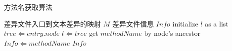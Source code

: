 \renewcommand{\thealgorithm}{1}
    \begin{algorithm}
        \caption{方法名获取算法}
        \begin{algorithmic}[1]
            \Require 差异文件入口到文本差异的映射 $M$
            \Ensure 差异文件信息 $Info$
            \State initialize $l$ as a list
                \State $tree \Leftarrow entry.node$
                    \State $l \Leftarrow tree$
                \EndIf
            \EndFor
                \State get $methodName$ by node's ancestor
                \State $Info \Leftarrow methodName$
            \EndFor
            \State \Return $Info$
        \end{algorithmic}
        \label{alg:get-method-name}
    \end{algorithm}